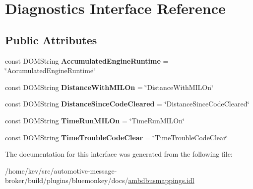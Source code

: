 \hypertarget{interfaceDiagnostics}{\section{Diagnostics Interface Reference}
\label{interfaceDiagnostics}
}
\subsection*{Public Attributes}
\begin{DoxyCompactItemize}
\item 
\hypertarget{interfaceDiagnostics_af8f65ae2123f41c68215a89acba50c9b}{const D\+O\+M\+String {\bfseries Accumulated\+Engine\+Runtime} = \char`\"{}Accumulated\+Engine\+Runtime\char`\"{}}\label{interfaceDiagnostics_af8f65ae2123f41c68215a89acba50c9b}

\item 
\hypertarget{interfaceDiagnostics_a79fff4ae27dd4008648fcf6578d7042f}{const D\+O\+M\+String {\bfseries Distance\+With\+M\+I\+L\+On} = \char`\"{}Distance\+With\+M\+I\+L\+On\char`\"{}}\label{interfaceDiagnostics_a79fff4ae27dd4008648fcf6578d7042f}

\item 
\hypertarget{interfaceDiagnostics_a11cd4c9caad67a28833b49c36f465af7}{const D\+O\+M\+String {\bfseries Distance\+Since\+Code\+Cleared} = \char`\"{}Distance\+Since\+Code\+Cleared\char`\"{}}\label{interfaceDiagnostics_a11cd4c9caad67a28833b49c36f465af7}

\item 
\hypertarget{interfaceDiagnostics_a3eabf393dc6417cc6e6be8010eb753f0}{const D\+O\+M\+String {\bfseries Time\+Run\+M\+I\+L\+On} = \char`\"{}Time\+Run\+M\+I\+L\+On\char`\"{}}\label{interfaceDiagnostics_a3eabf393dc6417cc6e6be8010eb753f0}

\item 
\hypertarget{interfaceDiagnostics_a1fbd44d083a78a6e29621d2168004f63}{const D\+O\+M\+String {\bfseries Time\+Trouble\+Code\+Clear} = \char`\"{}Time\+Trouble\+Code\+Clear\char`\"{}}\label{interfaceDiagnostics_a1fbd44d083a78a6e29621d2168004f63}

\end{DoxyCompactItemize}


The documentation for this interface was generated from the following file\+:\begin{DoxyCompactItemize}
\item 
/home/kev/src/automotive-\/message-\/broker/build/plugins/bluemonkey/docs/\hyperlink{ambdbusmappings_8idl}{ambdbusmappings.\+idl}\end{DoxyCompactItemize}
